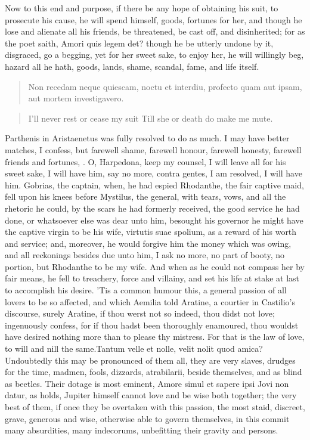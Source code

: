 Now to this end and purpose, if there be any hope of obtaining his
suit, to prosecute his cause, he will spend himself, goods, fortunes
for her, and though he lose and alienate all his friends, be
threatened, be cast off, and disinherited; for as the poet saith, Amori
quis legem det? though he be utterly undone by it, disgraced, go
a begging, yet for her sweet sake, to enjoy her, he will willingly beg,
hazard all he hath, goods, lands, shame, scandal, fame, and life
itself.

\begin{latin}
\begin{verse}
Non recedam neque quiescam, noctu et interdiu,
profecto quam aut ipsam, aut mortem investigavero.
\end{verse}
\end{latin}
\translationrule%
\begin{verse}%
I'll never rest or cease my suit
Till she or death do make me mute.
\end{verse}%

Parthenis in Aristaenetus was fully resolved to do as much. I may
have better matches, I confess, but farewell shame, farewell honour,
farewell honesty, farewell friends and fortunes, \etc{}. O, Harpedona, keep
my counsel, I will leave all for his sweet sake, I will have him, say
no more, contra gentes, I am resolved, I will have him. Gobrias,
the captain, when, he had espied Rhodanthe, the fair captive maid, fell
upon his knees before Mystilus, the general, with tears, vows, and all
the rhetoric he could, by the scars he had formerly received, the good
service he had done, or whatsoever else was dear unto him, besought his
governor he might have the captive virgin to be his wife, virtutis suae
spolium, as a reward of his worth and service; and, moreover, he would
forgive him the money which was owing, and all reckonings besides due
unto him, I ask no more, no part of booty, no portion, but Rhodanthe to
be my wife. And when as he could not compass her by fair means, he fell
to treachery, force and villainy, and set his life at stake at last to
accomplish his desire. 'Tis a common humour this, a general passion of
all lovers to be so affected, and which Aemilia told Aratine, a
courtier in Castilio's discourse, surely Aratine, if thou werst not so
indeed, thou didst not love; ingenuously confess, for if thou hadst
been thoroughly enamoured, thou wouldst have desired nothing more than
to please thy mistress. For that is the law of love, to will and nill
the same.Tantum velle et nolle, velit nolit quod amica?
Undoubtedly this may be pronounced of them all, they are very slaves,
drudges for the time, madmen, fools, dizzards, atrabilarii,
beside themselves, and as blind as beetles. Their dotage is most
eminent, Amore simul et sapere ipsi Jovi non datur, as \Seneca{} holds,
Jupiter himself cannot love and be wise both together; the very best of
them, if once they be overtaken with this passion, the most staid,
discreet, grave, generous and wise, otherwise able to govern
themselves, in this commit many absurdities, many indecorums,
unbefitting their gravity and persons.

